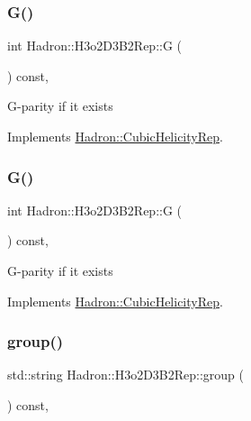 \subsubsection{\texorpdfstring{G()}{G()}\hspace{0.1cm}{\footnotesize\ttfamily [1/2]}}
{\footnotesize\ttfamily int Hadron\+::\+H3o2\+D3\+B2\+Rep\+::G (\begin{DoxyParamCaption}{ }\end{DoxyParamCaption}) const\hspace{0.3cm}{\ttfamily [inline]}, {\ttfamily [virtual]}}

G-\/parity if it exists 

Implements \mbox{\hyperlink{structHadron_1_1CubicHelicityRep_a50689f42be1e6170aa8cf6ad0597018b}{Hadron\+::\+Cubic\+Helicity\+Rep}}.

\mbox{\label{structHadron_1_1H3o2D3B2Rep_acae6192425a1ab69943fdad0b8192817}} 
\subsubsection{\texorpdfstring{G()}{G()}\hspace{0.1cm}{\footnotesize\ttfamily [2/2]}}
{\footnotesize\ttfamily int Hadron\+::\+H3o2\+D3\+B2\+Rep\+::G (\begin{DoxyParamCaption}{ }\end{DoxyParamCaption}) const\hspace{0.3cm}{\ttfamily [inline]}, {\ttfamily [virtual]}}

G-\/parity if it exists 

Implements \mbox{\hyperlink{structHadron_1_1CubicHelicityRep_a50689f42be1e6170aa8cf6ad0597018b}{Hadron\+::\+Cubic\+Helicity\+Rep}}.

\mbox{\label{structHadron_1_1H3o2D3B2Rep_a5f90a196c20d41622da336eefc77cfd1}} 
\subsubsection{\texorpdfstring{group()}{group()}\hspace{0.1cm}{\footnotesize\ttfamily [1/3]}}
{\footnotesize\ttfamily std\+::string Hadron\+::\+H3o2\+D3\+B2\+Rep\+::group (\begin{DoxyParamCaption}{ }\end{DoxyParamCaption}) const\hspace{0.3cm}{\ttfamily [inline]}, {\ttfamily [virtual]}}

